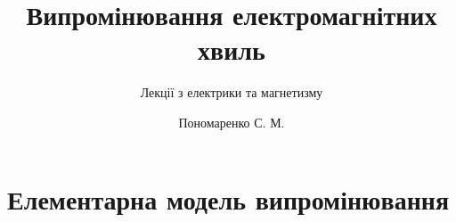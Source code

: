 \documentclass[onlytextwidth]{beamer}
\title[Лекції електрики та магнетизму]{\huge\bfseries Випромінювання електромагнітних хвиль}
\subtitle{Лекції з електрики та магнетизму}
\author{Пономаренко С. М.}
\date{}
\begin{document}
\begin{frame}[plain]
	\maketitle
\end{frame}

\section{Елементарна модель випромінювання}


\end{document}
